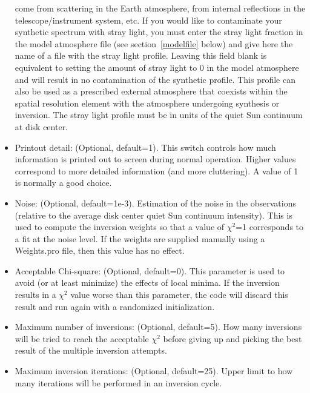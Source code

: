 \begin{itemize}
  come from scattering in the Earth atmosphere, from internal
  reflections in the telescope/instrument system, etc. If you would
  like to contaminate your synthetic spectrum with stray light, you
  must enter the stray light fraction in the model atmosphere file
  (see section~\ref{modelfile} below) and give here the name of a file
  with the stray light profile.  Leaving this field blank is
  equivalent to setting the amount of stray light to 0 in the model
  atmosphere and will result in no contamination of the synthetic
  profile. This profile can also be used as a prescribed external
  atmosphere that coexists within the spatial resolution element with
  the atmosphere undergoing synthesis or inversion. The stray light profile must be in units of the quiet Sun continuum at disk center.
\item Printout detail: (Optional, default=1). This switch controls how
  much information is printed out to screen during normal
  operation. Higher values correspond to more detailed information
  (and more cluttering).  A value of 1 is normally a good choice.
\item Noise: (Optional, default=1e-3). Estimation of the noise in the
  observations (relative to the average disk center quiet Sun
  continuum intensity). This is used to compute the inversion weights
  so that a value of $\chi^2$=1 corresponds to a fit at the noise
  level. If the weights are supplied manually using a Weights.pro
  file, then this value has no effect.
\item Acceptable Chi-square: (Optional, default=0). This parameter is
  used to avoid (or at least minimize) the effects of local minima. If
  the inversion results in a $\chi^2$ value worse than this parameter,
  the code will discard this result and run again with a randomized
  initialization.
\item Maximum number of inversions: (Optional, default=5). How many
  inversions will be tried to reach the acceptable $\chi^2$ before
  giving up and picking the best result of the multiple inversion
  attempts.
\item Maximum inversion iterations: (Optional, default=25). Upper
  limit to how many iterations will be performed in an inversion
  cycle.

\end{itemize}
